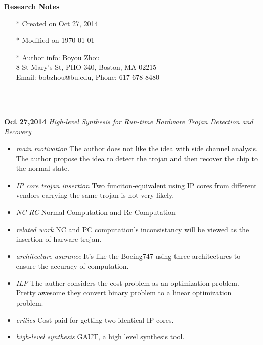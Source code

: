 \documentclass[]{article}
\begin{document}
\pagestyle{empty}
{\large\textbf{Research Notes}}
\begin{itemize}
    \item[*] Created on Oct 27, 2014
    \item[*] Modified on \today
    \item[*] Author info: Boyou Zhou\\
             8 St Mary's St, PHO 340, Boston, MA 02215\\
             Email: bobzhou@bu.edu, Phone: 617-678-8480
\end{itemize}

\rule[-0.1cm]{7.5in}{0.01cm}\\
\\
\noindent \textbf{Oct 27,2014}
\textit{High-level Synthesis for Run-time Hardware Trojan Detection and
Recovery}
\indent		\begin{itemize}
            \item \textit{main motivation} The author does not like the idea
            with side channel analysis. The author propose the idea to detect
            the trojan and then recover the chip to the normal state. 
            \item \textit{IP core trojan insertion} Two funciton-equivalent
            using IP cores from different vendors carrying the same trojan is
            not very likely.  
            \item \textit{NC RC} Normal Computation and Re-Computation
            \item \textit{related work} NC and PC computation's inconsistancy
            will be viewed as the insertion of harware trojan.
            \item \textit{architecture asurance} It's like the Boeing747 using
            three architectures to ensure the accuracy of computation.
            \item \textit{ILP} The auther considers the cost problem as an
            optimization problem. Pretty awesome they convert binary problem to
            a linear optimization problem.
            \item \textit{critics} Cost paid for getting two identical IP
            cores.
            \item \textit{high-level synthesis} GAUT, a high level synthesis
            tool.
            \end{itemize}
\end{document}
